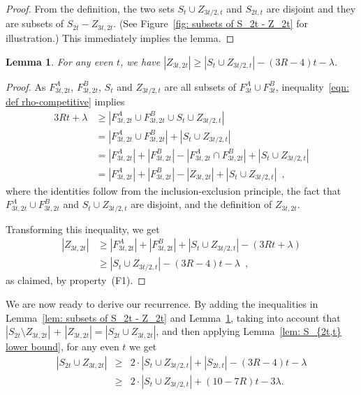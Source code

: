 \documentclass[11pt]{article}
\newtheorem{lemma}[theorem]{Lemma}
\begin{document}
\begin{proof}
From the definition, the two sets
$S_{t}\cup Z_{3t/2,t}$ and $S_{2t,t}$ are disjoint
and they are subsets of $S_{2t} - Z_{3t,2t}$.
(See Figure~\ref{fig: subsets of S_2t - Z_2t} for illustration.)
This immediately implies the lemma. 
\end{proof}



\begin{lemma}\label{lem: 3Rt + ... >= 4t}
For any even $t$, we have
$|Z_{3t,2t}| \ge |S_{t} \cup Z_{3t/2,t}| - (3R-4)t - \lambda$.
\end{lemma}

\begin{proof}
As $F^A_{3t,2t}$, $F^B_{3t,2t}$, $S_t$ and $Z_{3t/2,t}$ are all subsets of $F^A_{3t}\cup F^B_{3t}$,
inequality~\eqref{eqn: def rho-competitive} implies
\begin{align*}
3Rt+\lambda 	&\geq |F^A_{3t,2t}\cup F^B_{3t,2t}\cup S_t\cup Z_{3t/2,t}|\\
		&= |F^A_{3t,2t}\cup F^B_{3t,2t}| + |S_t \cup Z_{3t/2,t}|\\
		&= |F^A_{3t,2t}| + |F^B_{3t,2t}| - |F^A_{3t,2t}\cap F^B_{3t,2t}|+ |S_t \cup Z_{3t/2,t}|\\
		&= |F^A_{3t,2t}| + |F^B_{3t,2t}| - |Z_{3t,2t}|+ |S_t \cup Z_{3t/2,t}| \enspace,
\end{align*}
where the identities follow from the inclusion-exclusion principle, the fact that
$F^A_{3t,2t}\cup F^B_{3t,2t}$ and $S_t\cup Z_{3t/2,t}$ are disjoint, and the definition
of $Z_{3t,2t}$.

Transforming this inequality, we get
\begin{align*}
|Z_{3t,2t}| 	&\geq |F^A_{3t,2t}| + |F^B_{3t,2t}| + |S_t\cup Z_{3t/2,t}| -(3Rt+\lambda)\\
		&\geq |S_t\cup Z_{3t/2,t}| - (3R-4)t -\lambda \enspace,
\end{align*}
as claimed, by property~(F1).
\end{proof}

We are now ready to derive our recurrence. By adding the inequalities in
Lemma~\ref{lem: subsets of S_2t - Z_2t} and Lemma~\ref{lem: 3Rt + ... >= 4t},
taking into account that $|S_{2t} \setminus Z_{3t,2t}|$ + $|Z_{3t,2t}|
= |S_{2t} \cup Z_{3t,2t}|$,
and then applying Lemma~\ref{lem: S_{2t,t} lower bound},
for any even $t$ we get
\begin{eqnarray}
|S_{2t} \cup Z_{3t,2t}| 
	&\ge& 2\cdot |S_{t} \cup Z_{3t/2,t}| + |S_{2t,t}| - (3R-4)t - \lambda
		\nonumber
		\\
	&\ge&  2\cdot |S_{t} \cup Z_{3t/2,t}| + (10-7R)t - 3\lambda.
		\label{eqn: lb main recurrence}
\end{eqnarray}
\end{document}
